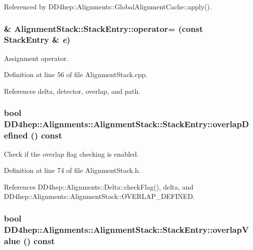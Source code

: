 Referenced by DD4hep::Alignments::GlobalAlignmentCache::apply().\hypertarget{struct_d_d4hep_1_1_alignments_1_1_alignment_stack_1_1_stack_entry_ac970428872fc608121623bdb91ebc8ec}{
\subsubsection[{operator=}]{ \& AlignmentStack::StackEntry::operator= (const {\bf StackEntry} \& {\em e})}}
\label{struct_d_d4hep_1_1_alignments_1_1_alignment_stack_1_1_stack_entry_ac970428872fc608121623bdb91ebc8ec}


Assignment operator. 

Definition at line 56 of file AlignmentStack.cpp.

References delta, detector, overlap, and path.\hypertarget{struct_d_d4hep_1_1_alignments_1_1_alignment_stack_1_1_stack_entry_a6a601285c13f0dc1beb95edd6c1d26ba}{
\subsubsection[{overlapDefined}]{\setlength{\rightskip}{0pt plus 5cm}bool DD4hep::Alignments::AlignmentStack::StackEntry::overlapDefined () const}}
\label{struct_d_d4hep_1_1_alignments_1_1_alignment_stack_1_1_stack_entry_a6a601285c13f0dc1beb95edd6c1d26ba}


Check if the overlap flag checking is enabled. 

Definition at line 74 of file AlignmentStack.h.

References DD4hep::Alignments::Delta::checkFlag(), delta, and DD4hep::Alignments::AlignmentStack::OVERLAP\_\-DEFINED.\hypertarget{struct_d_d4hep_1_1_alignments_1_1_alignment_stack_1_1_stack_entry_a56268e20d98f780ae8d6c21ce183ab43}{
\subsubsection[{overlapValue}]{\setlength{\rightskip}{0pt plus 5cm}bool DD4hep::Alignments::AlignmentStack::StackEntry::overlapValue () const}}
\label{struct_d_d4hep_1_1_alignments_1_1_alignment_stack_1_1_stack_entry_a56268e20d98f780ae8d6c21ce183ab43}


